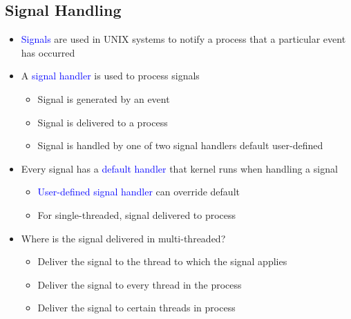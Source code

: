 \documentclass[oneside]{book}
\begin{document}
            \subsection{Signal Handling}
                \begin{itemize}
                    \item \textcolor{blue}{Signals} are used in UNIX systems to notify a process that a particular event has occurred
                    \item A \textcolor{blue}{signal handler} is used to process signals
                        \begin{itemize}
                            \item Signal is generated by an event
                            \item Signal is delivered to a process
                            \item Signal is handled by one of two signal handlers
                                \subitem default
                                \subitem user-defined
                        \end{itemize}
                    \item Every signal has a \textcolor{blue}{default handler} that kernel runs when handling a signal
                        \begin{itemize}
                            \item \textcolor{blue}{User-defined signal handler} can override default
                            \item For single-threaded, signal delivered to process
                        \end{itemize}
                    \item Where is the signal delivered in multi-threaded?
                        \begin{itemize}
                            \item Deliver the signal to the thread to which the signal applies
                            \item Deliver the signal to every thread in the process
                            \item Deliver the signal to certain threads in process
                        \end{itemize}
                \end{itemize}
\end{document}
